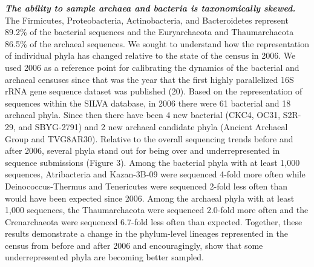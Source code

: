 \documentclass[11pt,]{article}
\begin{document}
\textbf{\emph{The ability to sample archaea and bacteria is
taxonomically skewed.}} The Firmicutes, Proteobacteria, Actinobacteria,
and Bacteroidetes represent 89.2\% of the bacterial sequences and the
Euryarchaeota and Thaumarchaeota 86.5\% of the archaeal sequences. We
sought to understand how the representation of individual phyla has
changed relative to the state of the census in 2006. We used 2006 as a
reference point for calibrating the dynamics of the bacterial and
archaeal censuses since that was the year that the first highly
parallelized 16S rRNA gene sequence dataset was published (20). Based on
the representation of sequences within the SILVA database, in 2006 there
were 61 bacterial and 18 archaeal phyla. Since then there have been 4
new bacterial (CKC4, OC31, S2R-29, and SBYG-2791) and 2 new archaeal
candidate phyla (Ancient Archaeal Group and TVG8AR30). Relative to the
overall sequencing trends before and after 2006, several phyla stand out
for being over and underrepresented in sequence submissions (Figure 3).
Among the bacterial phyla with at least 1,000 sequences, Atribacteria
and Kazan-3B-09 were sequenced 4-fold more often while
Deinococcus-Thermus and Tenericutes were sequenced 2-fold less often
than would have been expected since 2006. Among the archaeal phyla with
at least 1,000 sequences, the Thaumarchaeota were sequenced 2.0-fold
more often and the Crenarchaeota were sequenced 6.7-fold less often than
expected. Together, these results demonstrate a change in the
phylum-level lineages represented in the census from before and after
2006 and encouragingly, show that some underrepresented phyla are
becoming better sampled.
\end{document}
